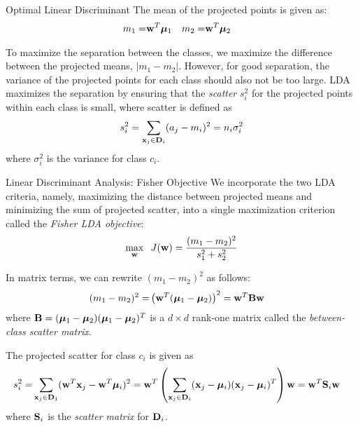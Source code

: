 \begin{frame}{Optimal Linear Discriminant}
The mean of the projected points is given as:
\begin{align*}
    m_1  = & \mathbf{w}^T{\bm \mu}_1 & 
	m_2 = & \mathbf{w}^T{\bm \mu}_2
\end{align*}

To maximize the separation between the classes, we 
maximize the difference between the projected means,
$|m_1 - m_2|$. However, for good separation,
the variance of the projected points for each class should also
not be too large. 
LDA
maximizes the separation by ensuring that the {\em
  scatter} $s_i^2$ for the projected points within each class is
small, where scatter is def\/{i}ned as
\begin{align*}
  s_i^2 = \displaystyle \sum_{\mathbf{x}_{j} \in \mathbf{D}_i} (a_{j} - m_i)^2 = n_i \sigma_i^2
\end{align*}
where $\sigma_i^2$ is the
variance for class $c_i$.
\end{frame}



\begin{frame}{Linear Discriminant Analysis: F{i}sher Objective}
  \small
We incorporate the two LDA criteria, namely, maximizing the
distance between projected means and minimizing the sum of
projected scatter, into a single maximization criterion called the
{\em F{i}sher LDA objective}: 
\begin{align*}
    \max_{\mathbf{w}} \;\; J(\mathbf{w}) = \frac{(m_1 - m_2)^2}{s_1^2 + s_2^2}
\end{align*}

\medskip
In matrix terms, we can rewrite $(m_1 - m_2)^2$ as follows:
\begin{align*}
  (m_1 - m_2)^2 = & \left(\mathbf{w}^T({\bm \mu}_1 - {\bm \mu}_2)\right)^2 = \mathbf{w}^T\mathbf{B}\mathbf{w}
\end{align*}
where $\mathbf{B} = ({\bm \mu}_1 - {\bm \mu}_2) ({\bm \mu}_1 - {\bm \mu}_2)^T$ is a $d\times
d$ rank-one matrix called the {\em between-class scatter matrix}.

\medskip
The projected scatter for class $c_i$ is given as
\begin{align*}
  s_i^2 = &
  \displaystyle \sum_{\mathbf{x}_j \in \mathbf{D}_1} (\mathbf{w}^T\mathbf{x}_j - \mathbf{w}^T{\bm \mu}_i)^2
  =  \mathbf{w}^T \left(\displaystyle \sum_{\mathbf{x}_j \in \mathbf{D}_i} (\mathbf{x}_j - {\bm \mu}_i)(\mathbf{x}_j -
  {\bm \mu}_i)^T \right) \mathbf{w}
  =  \mathbf{w}^T\mathbf{S}_i\mathbf{w}
\end{align*}
where $\mathbf{S}_i$ is the {\em scatter matrix} for $\mathbf{D}_i$.
\end{frame}


